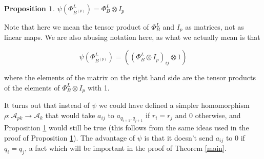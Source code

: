 \documentclass[11pt]{amsart}
\def\A{{\mathcal A}}
\newtheorem{prop}[thm]{Proposition}
\begin{document}
\begin{prop}\label{psiofbp}
$\psi\left(\Phi_{B^{(p)}}^L\right) = \Phi_{B}^L\otimes I_p$
\end{prop}


Note that here we mean the tensor product of $\Phi_B^L$ and $I_p$ as matrices, not as linear maps.  We are also abusing notation here, as what we actually mean is that

$$\psi\left(\Phi_{B^{(p)}}^L\right) = \left(\left(\Phi_{B}^L\otimes I_p\right)_{ij}\otimes 1\right)$$

where the elements of the matrix on the right hand side are the tensor products of the elements of $\Phi_{B}^L\otimes I_p$ with 1. 

It turns out that instead of $\psi$ we could have defined a simpler homomorphism $\rho\colon \A_{pk}\rightarrow \A_k$ that would take $a_{ij}$ to $a_{q_{i+1},q_{j+1}}$ if $r_i=r_j$ and 0 otherwise, and Proposition \ref{psiofbp} would still be true (this follows from the same ideas used in the proof of Proposition \ref{psiofbp}).  The advantage of $\psi$ is that it doesn't send $a_{ij}$ to 0 if $q_i=q_j$, a fact which will be important in the proof of Theorem \ref{main}.
\end{document}
